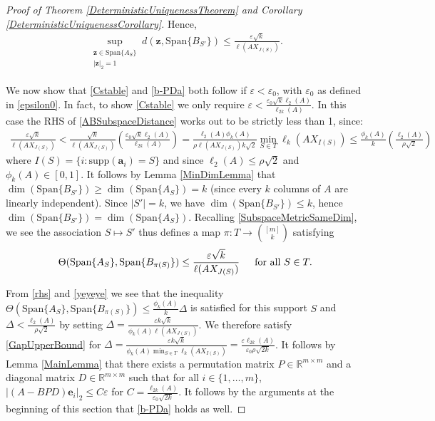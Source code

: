 \documentclass[journal, onecolumn]{IEEEtran}
\begin{document}
\begin{proof}[Proof of Theorem \ref{DeterministicUniquenessTheorem} and Corollary \ref{DeterministicUniquenessCorollary}]
Hence,
\begin{align}\label{ABSubspaceDistance}
\sup_{ \substack{ \mathbf{z} \in \text{Span}\{A_{S}\} \\ |\mathbf{z}|_2 = 1} } d(\mathbf{z}, \text{Span}\{B_{S'}\}) \leq \frac{\varepsilon\sqrt{k}}{\ell(AX_{J(S)})}.
\end{align}

We now show that \eqref{Cstable} and \eqref{b-PDa} both follow if $\varepsilon < \varepsilon_0$, with $\varepsilon_0$ as defined in \eqref{epsilon0}. In fact, to show \eqref{Cstable} we only require $\varepsilon <  \frac{\varepsilon_0 \sqrt{k} \ell_2(A)}{\ell_{2k}(A)}$. In this case the RHS of \eqref {ABSubspaceDistance} works out to be strictly less than 1, since:
\begin{align}\label{rhs}
\frac{\varepsilon\sqrt{k}}{\ell(AX_{J(S)})} 
< \frac{\sqrt{k}}{\ell(AX_{J(S)})} \left( \frac{\varepsilon_0 \sqrt{k} \ell_2(A)}{\ell_{2k}(A)} \right)
= \frac{\ell_2(A) \phi_k(A)}{\rho \ell(AX_{J(S)}) k \sqrt{2}} \min_{S \in T}\ell_k(AX_{I(S)})
\leq \frac{\phi_k(A)}{k} \left( \frac{\ell_2(A)}{ \rho \sqrt{2}} \right)
\end{align}
%
where $I(S) = \{i: \text{supp}(\mathbf{a}_i)=S\}$ and since $\ell_2(A) \leq \rho \sqrt{2}$ and $\phi_k(A) \in [0,1]$. It follows by Lemma \ref{MinDimLemma} that $\dim(\text{Span}\{B_{S'}\}) \geq \dim(\text{Span}\{A_{S}\}) = k$ (since every $k$ columns of $A$ are linearly independent). Since $|S'| = k$, we have $\dim(\text{Span}\{B_{S'}\}) \leq k$, hence $\dim(\text{Span}\{B_{S'}\}) = \dim(\text{Span}\{A_{S}\})$. Recalling \eqref{SubspaceMetricSameDim},  we see the association $S \mapsto S'$ thus defines a map $\pi: T \to {[m] \choose k}$ satisfying
\begin{align}\label{yeyeye}
\Theta(\text{Span}\{A_{S}\}, \text{Span}\{B_{\pi(S)}\}) \leq \frac{\varepsilon\sqrt{k}}{\ell(AX_{J(S)})} \indent \text{for all } S \in T.
\end{align}

From \eqref{rhs} and \eqref{yeyeye} we see that the inequality $\Theta(\text{Span}\{A_{S}\}, \text{Span}\{B_{\pi(S)}\}) \leq \frac{ \phi_k(A) }{k} \Delta$ is satisfied for this support $S$ and $\Delta < \frac{\ell_2(A)}{\rho \sqrt{2}}$ by setting $\Delta = \frac{\varepsilon k\sqrt{k}}{\phi_k(A)\ell(AX_{J(S)})}$. We therefore satisfy \eqref{GapUpperBound} for $\Delta = \frac{\varepsilon k\sqrt{k}}{\phi_k(A)\min_{S \in T} \ell_k(AX_{I(S)})} = \frac{\varepsilon \ell_{2k}(A)}{\varepsilon_0 \rho \sqrt{2k}}$. It follows by Lemma \ref{MainLemma} that there exists a permutation matrix $P \in \mathbb{R}^{m \times m}$ and a diagonal matrix $D \in \mathbb{R}^{m \times m}$ such that for all $i \in \{1, \ldots, m\}$,
$|(A - BPD)\mathbf{e}_i|_2 \leq C\varepsilon$ for $C = \frac{ \ell_{2k}(A)}{\varepsilon_0 \sqrt{2k}}$. It follows by the arguments at the beginning of this section that \eqref{b-PDa} holds as well.
\end{proof}
\end{document}

